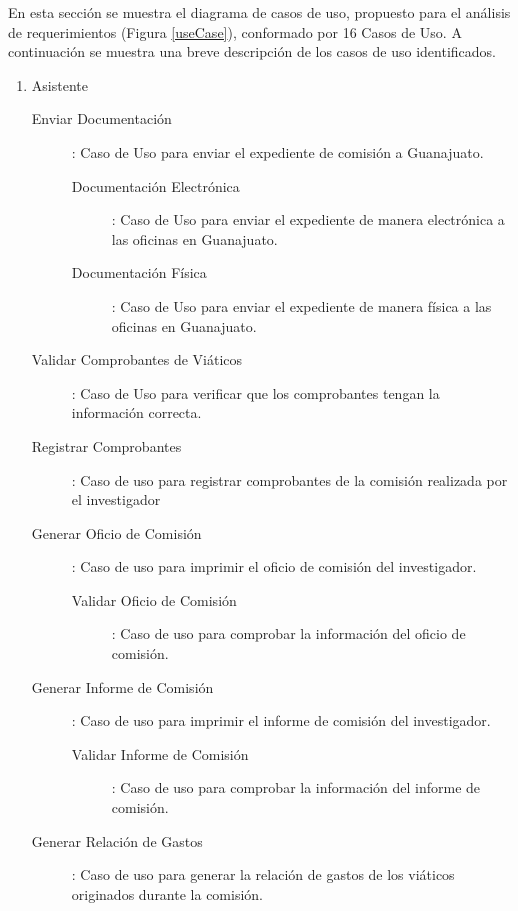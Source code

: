 \documentclass{report}
\begin{document}
    En esta sección se muestra el diagrama de casos de uso, propuesto para el análisis de requerimientos (Figura \ref{useCase}), conformado por 16 Casos de Uso. A continuación se muestra una breve descripción  de los casos de uso identificados.\\
    \begin{enumerate}
        \item Asistente    
        \begin{description}
            \item[Enviar Documentación]: Caso de Uso para enviar el expediente de comisión a Guanajuato.
            \begin{description}
                \item[Documentación Electrónica]: Caso de Uso para enviar el expediente de manera electrónica a las oficinas en Guanajuato.
                \item[Documentación Física]: Caso de Uso para enviar el expediente de manera física a las oficinas en Guanajuato.
            \end{description}
            \item[Validar Comprobantes de Viáticos]: Caso de Uso para verificar que los comprobantes tengan la información correcta.
            \item[Registrar Comprobantes]: Caso de uso para registrar comprobantes de la comisión realizada por el investigador
            \item[Generar Oficio de Comisión]: Caso de uso para imprimir el oficio de comisión del investigador.
            \begin{description}
                \item[Validar Oficio de Comisión]: Caso de uso para comprobar la información del oficio de comisión.
            \end{description}
            \item[Generar Informe de Comisión]: Caso de uso para imprimir el informe de comisión del investigador. 
            \begin{description}
                \item[Validar Informe de Comisión]: Caso de uso para comprobar la información del informe de comisión.
            \end{description}
            \item[Generar Relación de Gastos]: Caso de uso para generar la relación de gastos de los viáticos originados  durante la comisión.
            \begin{description}

\end{description}
\end{description}
\end{enumerate}
\end{document}
